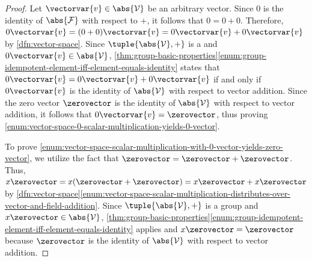 \begin{proof}
    Let \( \vectorvar{v} \in \abs{\mathcal{V}} \) be an arbitrary vector. Since \( 0 \) is the identity of \( \abs{\mathcal{F}} \) with respect
    to \( + \), it follows that \( 0 = 0 + 0 \). Therefore, \( 0\vectorvar{v} = \mleft( 0 + 0 \mright)\vectorvar{v} = 0\vectorvar{v} + 0\vectorvar{v}\)
    by \cref{dfn:vector-space}. Since \( \tuple{\abs{\mathcal{V}}, +} \) is a  and \( 0\vectorvar{v} \in \abs{\mathcal{V}} \),
    \cref{thm:group-basic-properties}\ref{enum:group-idempotent-element-iff-element-equals-identity} states that
    \( 0\vectorvar{v} = 0\vectorvar{v} + 0\vectorvar{v} \) if and only if \( 0\vectorvar{v} \) is the identity of \( \abs{\mathcal{V}} \) with respect
    to vector addition. Since the zero vector \( \zerovector \) is the identity of \( \abs{\mathcal{V}} \) with respect to vector addition, it follows
    that \( 0\vectorvar{v} = \zerovector \), thus proving \ref{enum:vector-space-0-scalar-multiplication-yields-0-vector}.

    \vspace{0.3cm}
    \noindent
    To prove \ref{enum:vector-space-scalar-multiplication-with-0-vector-yields-zero-vector}, we utilize the fact that \( \zerovector = \zerovector + \zerovector \).
    Thus, \( x\zerovector = x \mleft( \zerovector + \zerovector \mright) = x\zerovector + x\zerovector \) by
    \cref{dfn:vector-space}\ref{enum:vector-space-scalar-multiplication-distributes-over-vector-and-field-addition}.
    Since \( \tuple{\abs{\mathcal{V}},+} \) is a group and \( x\zerovector \in \abs{\mathcal{V}} \),
    \cref{thm:group-basic-properties}\ref{enum:group-idempotent-element-iff-element-equals-identity} applies and \( x\zerovector = \zerovector \) because
    \( \zerovector \) is the identity of \( \abs{\mathcal{V}} \) with respect to vector addition.


\end{proof}
